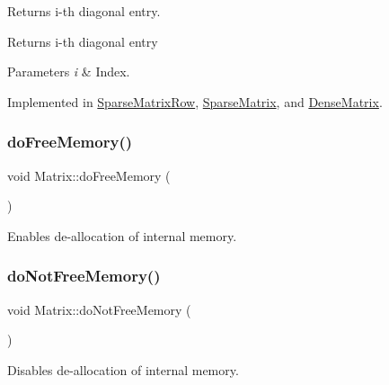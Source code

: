 Returns i-\/th diagonal entry. \begin{DoxyReturn}{Returns}
i-\/th diagonal entry 
\end{DoxyReturn}

\begin{DoxyParams}{Parameters}
{\em i} & Index. \\
\hline
\end{DoxyParams}


Implemented in \hyperlink{class_sparse_matrix_row_a1a7b95bc5e229f7f295ddbe95f57f67f}{Sparse\+Matrix\+Row}, \hyperlink{class_sparse_matrix_a0a85fc812509525708eae5d94fd5dcb8}{Sparse\+Matrix}, and \hyperlink{class_dense_matrix_a16eea4106ac1875461f2e9fb4a8204f5}{Dense\+Matrix}.

\mbox{\label{class_matrix_a9b1c0fc70cad1b88d6e6ab960bda478d}} 
\subsubsection{\texorpdfstring{do\+Free\+Memory()}{doFreeMemory()}}
{\footnotesize\ttfamily void Matrix\+::do\+Free\+Memory (\begin{DoxyParamCaption}{ }\end{DoxyParamCaption})\hspace{0.3cm}{\ttfamily [inline]}}

Enables de-\/allocation of internal memory. \mbox{\label{class_matrix_a1a25e70b54e2101eb2d0c2b8a26c3d97}} 
\subsubsection{\texorpdfstring{do\+Not\+Free\+Memory()}{doNotFreeMemory()}}
{\footnotesize\ttfamily void Matrix\+::do\+Not\+Free\+Memory (\begin{DoxyParamCaption}{ }\end{DoxyParamCaption})\hspace{0.3cm}{\ttfamily [inline]}}

Disables de-\/allocation of internal memory. \mbox{\label{class_matrix_abf41d80f7392e9d63e9b2fa4b822d3b9}} 
